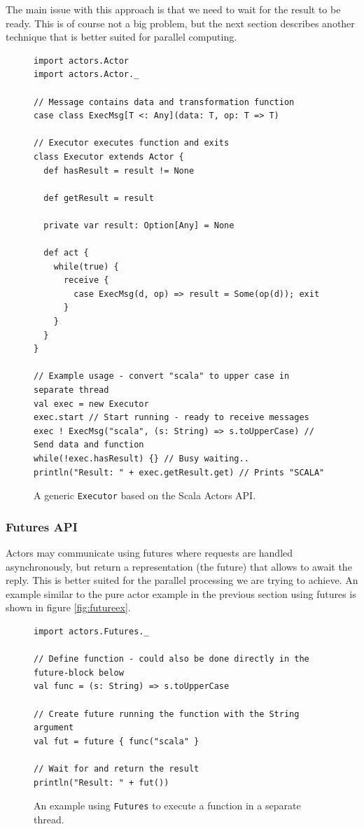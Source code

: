 \documentclass[a4paper,english]{report}
\begin{document}
The main issue with this approach is that we need to wait for the
result to be ready. This is of course not a big problem, but the next
section describes another technique that is better suited for parallel
computing.

\begin{figure}
  \begin{lstlisting}
import actors.Actor
import actors.Actor._

// Message contains data and transformation function
case class ExecMsg[T <: Any](data: T, op: T => T)

// Executor executes function and exits
class Executor extends Actor {
  def hasResult = result != None

  def getResult = result

  private var result: Option[Any] = None

  def act {
    while(true) {
      receive {
        case ExecMsg(d, op) => result = Some(op(d)); exit
      }
    }
  }
}

// Example usage - convert "scala" to upper case in separate thread
val exec = new Executor
exec.start // Start running - ready to receive messages
exec ! ExecMsg("scala", (s: String) => s.toUpperCase) // Send data and function
while(!exec.hasResult) {} // Busy waiting..
println("Result: " + exec.getResult.get) // Prints "SCALA"
  \end{lstlisting}
  \caption{A generic \texttt{Executor} based on the Scala Actors
    API.\label{fig:actorexecutor}}
\end{figure}

\subsubsection{Futures API}
\label{sec:futures}

Actors may communicate using futures where requests are handled
asynchronously, but return a representation (the future) that allows
to await the reply. This is better suited for the parallel processing
we are trying to achieve. An example similar to the pure actor example
in the previous section using futures is shown in figure
\vref{fig:futureex}.

\begin{figure}
  \begin{lstlisting}
import actors.Futures._

// Define function - could also be done directly in the future-block below
val func = (s: String) => s.toUpperCase

// Create future running the function with the String argument
val fut = future { func("scala" }

// Wait for and return the result
println("Result: " + fut())
  \end{lstlisting}
  \caption{An example using \texttt{Futures} to execute a function in
    a separate thread.\label{fig:futureex}}
\end{figure}
\end{document}
